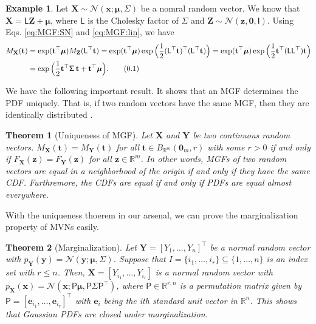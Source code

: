 \documentclass[10pt]{article}
\newtheorem{thm}{Theorem}[section]
\theoremstyle{definition}
\newtheorem{exmp}{Example}[section]
\newcommand\eqnum{\addtocounter{equation}{1}\tag{\arabic{section}.\arabic{equation}}}
\begin{document}
\begin{exmp}
Let $\mathbf{X}\sim\mathcal{N}(\mathbf{x};\boldsymbol{\mu},\mathsf{\Sigma})$ be a nomral random vector. We know that $\mathbf{X} = \mathsf{L}\mathbf{Z}+\boldsymbol{\mu}$, where $\mathsf{L}$ is the Cholesky factor of $\mathsf{\Sigma}$ and $\mathbf{Z}\sim\mathcal{N}(\mathbf{z}, \mathbf{0}, \mathsf{I})$. Using Eqs. \eqref{eq:MGF:SN} and \eqref{eq:MGF:lin}, we have
\begin{align*}
M_{\mathbf{X}}(\mathbf{t}) 
&= \exp(\mathbf{t}^{\top}\boldsymbol{\mu}) M_{\mathbf{Z}}(\mathsf{L}^{\top}\mathbf{t})
= \exp(\mathbf{t}^{\top}\boldsymbol{\mu}) \exp\Big(\frac{1}{2}\mathbf{(\mathsf{L}^{\top}\mathbf{t}})^{\top}(\mathbf{\mathsf{L}^{\top}\mathbf{t}})\Big)
= \exp(\mathbf{t}^{\top}\boldsymbol{\mu}) \exp\Big(\frac{1}{2}\mathbf{t}^{\top}(\mathsf{L}\mathsf{L}^{\top})\mathbf{t}\Big) \\
&= \exp\Big(\frac{1}{2}\mathbf{t}^{\top}\mathsf{\Sigma}\,\mathbf{t}+\mathbf{t}^{\top}\boldsymbol{\mu}\Big).
\eqnum
\label{eq:MGF:N}
\end{align*}
\end{exmp}
We have the following important result. It shows that an MGF determines the PDF uniquely. That is, if two random vectors have the same MGF, then they are identically distributed \cite{Linder2017}.
\begin{thm}[Uniqueness of MGF]
Let $\mathbf{X}$ and $\mathbf{Y}$ be two continuous random vectors. $M_{\mathbf{X}}(\mathbf{t})=M_{\mathbf{Y}}(\mathbf{t})$ for all $\mathbf{t}\in B_{\mathbb{R}^m}(\mathbf{0}_m, r)$ with some $r>0$ if and only if $F_{\mathbf{X}}(\mathbf{z})=F_{\mathbf{Y}}(\mathbf{z})$  for all $\mathbf{z}\in\mathbb{R}^m$. In other words, MGFs of two random vectors are equal in a neighborhood of the origin if and only if they have the same CDF. Furthremore, the CDFs are equal if and only if PDFs are equal almost everywhere.
\end{thm}
With the uniqueness thoerem in our arsenal, we can prove the marginalization property of MVNs easily.
\begin{thm}[Marginalization]\label{thm:MVN:marg}
Let $\mathbf{Y}=[Y_1,\dots,Y_n]^{\top}$ be a normal random vector with $p_{\mathbf{Y}}(\mathbf{y})=\mathcal{N}(\mathbf{y};\boldsymbol{\mu},\mathsf{\Sigma})$. Suppose that $I=\{i_1,\dots,i_r\}\subseteq\{1,\dots,n\}$ is an index set with $r\leq n$. Then, $\mathbf{X} =[Y_{i_1},\dots,Y_{i_r}]$ is a normal random vector with $p_{\mathbf{X}}(\mathbf{x})=\mathcal{N}(\mathbf{x};\mathsf{P}\boldsymbol{\mu},\mathsf{P}\mathsf{\Sigma}\mathsf{P}^{\top})$, where $\mathsf{P}\in\mathbb{R}^{r, n}$ is a permutation matrix given by $\mathsf{P}=[\mathbf{e}_{i_1},\dots,\mathbf{e}_{i_r}]^{\top}$ with $\mathbf{e}_i$ being the ith standard unit vector in $\mathbb{R}^n$. This shows that Gaussian PDFs are closed under marginalization.
\end{thm}
\end{document}

